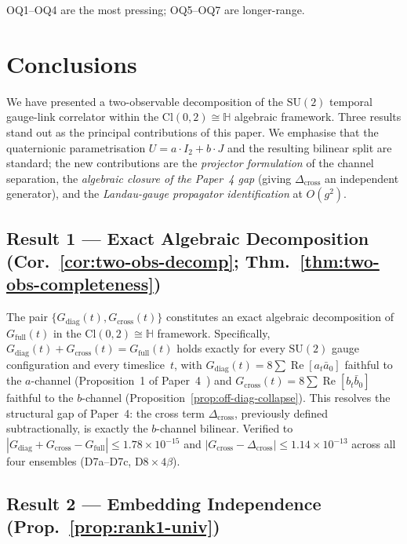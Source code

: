 \documentclass[12pt]{article}
\numberwithin{equation}{section}
\theoremstyle{plain}
\theoremstyle{definition}
\theoremstyle{remark}
\newcommand{\cl}{\mathrm{Cl}}              %
\newcommand{\su}{\mathrm{SU}}              %
\newcommand{\HH}{\mathbb{H}}               %
\newcommand{\Gdiag}{G_{\mathrm{diag}}}     %
\newcommand{\Gcross}{G_{\mathrm{cross}}}   %
\newcommand{\Gfull}{G_{\mathrm{full}}}     %
\newcommand{\Dcross}{\Delta_{\mathrm{cross}}}  %
\begin{document}
	\medskip\noindent
	OQ1--OQ4 are the most pressing; OQ5--OQ7 are longer-range.
	
	\section{Conclusions}
	\label{sec:conclusions}
	
	We have presented a two-observable decomposition of the $\su(2)$
	temporal gauge-link correlator within the $\cl(0,2)\cong\HH$
	algebraic framework.  Three results stand out as the principal
	contributions of this paper.  We emphasise that the quaternionic
	parametrisation $U = a\cdot I_2 + b\cdot J$ and the resulting
	bilinear split are standard; the new contributions are the
	\emph{projector formulation} of the channel separation, the
	\emph{algebraic closure of the Paper~4 gap} (giving $\Dcross$ an
	independent generator), and the \emph{Landau-gauge propagator
	identification} at $O(g^2)$.
	
	\subsection*{Result 1 --- Exact Algebraic Decomposition
		(Cor.~\ref{cor:two-obs-decomp};
		Thm.~\ref{thm:two-obs-completeness})}
	\label{sec:result1}
	
	The pair $\{\Gdiag(t),\Gcross(t)\}$ constitutes an exact algebraic
	decomposition of $\Gfull(t)$ in the $\cl(0,2)\cong\HH$ framework.
	Specifically, $\Gdiag(t) + \Gcross(t) = \Gfull(t)$ holds exactly for
	every $\su(2)$ gauge configuration and every timeslice~$t$, with
	$\Gdiag(t) = 8\sum\operatorname{Re}[a_t\bar{a}_0]$ faithful to the
	$a$-channel (Proposition~1 of Paper~4~\cite{FirestoneP4}) and
	$\Gcross(t) = 8\sum\operatorname{Re}[b_t\bar{b}_0]$ faithful to the
	$b$-channel
	(Proposition~\ref{prop:off-diag-collapse}).  This resolves the
	structural gap of Paper~4: the cross term $\Dcross$, previously
	defined subtractionally, is exactly the $b$-channel bilinear.
	Verified to $|\Gdiag + \Gcross - \Gfull|\leq 1.78\times 10^{-15}$
	and $|\Gcross - \Dcross|\leq 1.14\times 10^{-13}$ across all four
	ensembles (D7a--D7c, D8\,$\times\,4\beta$).
	
	\subsection*{Result 2 --- Embedding Independence
		(Prop.~\ref{prop:rank1-univ})}
	\label{sec:result2}
	
\end{document}
